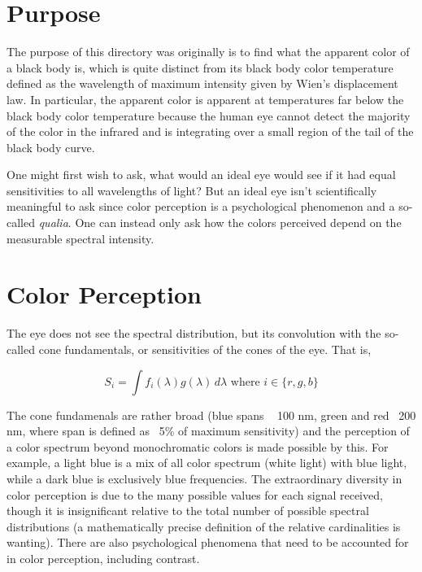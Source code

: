 \documentclass{article}
\begin{document}
\section{Purpose}

The purpose of this directory was originally is to find what the apparent color
of a black body is, which is quite distinct from its black body color
temperature defined as the wavelength of maximum intensity given by Wien's
displacement law. In particular, the apparent color is apparent at temperatures
far below the black body color temperature because the human eye cannot detect
the majority of the color in the infrared and is integrating over a small
region of the tail of the black body curve.

One might first wish to ask, what would an ideal eye would see if it had equal
sensitivities to all wavelengths of light? But an ideal eye isn't
scientifically meaningful to ask since color perception is a psychological
phenomenon and a so-called \emph{qualia}. One can instead only ask how the
colors perceived depend on the measurable spectral intensity.

\section{Color Perception} %

The eye does not see the spectral distribution, but its convolution with the
so-called cone fundamentals, or sensitivities of the cones of the eye. That is,

$$S_i = \int f_i(\lambda) g(\lambda) \, d\lambda \text{ where } i
\in \{r, g, b\}$$

The cone fundamenals are rather broad (blue spans ~ 100 nm, green and red~ 200
nm, where span is defined as ~5\% of maximum sensitivity) and the perception of
a color spectrum beyond monochromatic colors is made possible by this. For
example, a light blue is a mix of all color spectrum (white light) with blue
light, while a dark blue is exclusively blue frequencies. The extraordinary
diversity in color perception is due to the many possible values for each
signal received, though it is insignificant relative to the total number of
possible spectral distributions (a mathematically precise definition of the
relative cardinalities is wanting). There are also psychological phenomena that
need to be accounted for in color perception, including contrast.
\end{document}
